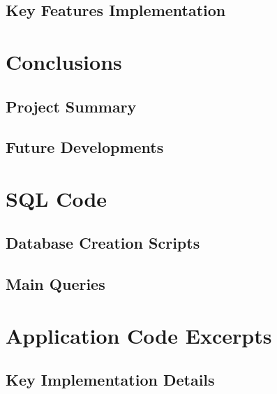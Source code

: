 \documentclass[12pt,a4paper]{report}
\begin{document}
\section{Key Features Implementation}

\chapter{Conclusions}
\section{Project Summary}
\section{Future Developments}

\appendix
\chapter{SQL Code}
\section{Database Creation Scripts}
\section{Main Queries}

\chapter{Application Code Excerpts}
\section{Key Implementation Details}
\end{document}
